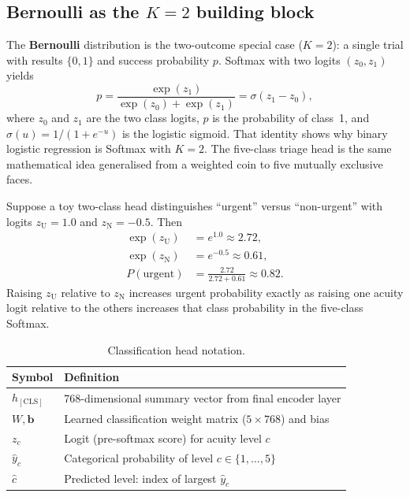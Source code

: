 \subsection{Bernoulli as the \(K=2\) building block}

The \textbf{Bernoulli} distribution is the two-outcome special case (\(K=2\)): a single trial with results \(\{0,1\}\) and success probability \(p\). Softmax with two logits \((z_0,z_1)\) yields
\begin{equation}
  p = \frac{\exp(z_1)}{\exp(z_0)+\exp(z_1)} = \sigma(z_1-z_0),
\end{equation}
where \(z_0\) and \(z_1\) are the two class logits, \(p\) is the probability of class~1, and \(\sigma(u)=1/(1+e^{-u})\) is the logistic sigmoid. That identity shows why binary logistic regression is Softmax with \(K=2\). The five-class triage head is the same mathematical idea generalised from a weighted coin to five mutually exclusive faces.

\begin{example}
Suppose a toy two-class head distinguishes ``urgent'' versus ``non-urgent'' with logits \(z_{\mathrm{U}}=1.0\) and \(z_{\mathrm{N}}=-0.5\). Then
\begin{align*}
  \exp(z_{\mathrm{U}}) &= e^{1.0}\approx 2.72, \\
  \exp(z_{\mathrm{N}}) &= e^{-0.5}\approx 0.61, \\
  P(\mathrm{urgent}) &= \frac{2.72}{2.72+0.61}\approx 0.82.
\end{align*}
Raising \(z_{\mathrm{U}}\) relative to \(z_{\mathrm{N}}\) increases urgent probability exactly as raising one acuity logit relative to the others increases that class probability in the five-class Softmax.
\end{example}

\begin{table}[H]
\centering
\small
\begin{tabular}{|l|p{10cm}|}
\hline
\textbf{Symbol} & \textbf{Definition} \\
\hline
\(h_{\mathrm{[CLS]}}\) & 768-dimensional summary vector from final encoder layer \\
\(W, \mathbf{b}\) & Learned classification weight matrix (\(5\times 768\)) and bias \\
\(z_c\) & Logit (pre-softmax score) for acuity level \(c\) \\
\(\hat{y}_c\) & Categorical probability of level \(c \in \{1,\ldots,5\}\) \\
\(\hat{c}\) & Predicted level: index of largest \(\hat{y}_c\) \\
\hline
\end{tabular}
\caption{Classification head notation.}
\label{tab:class-symbols}
\end{table}


